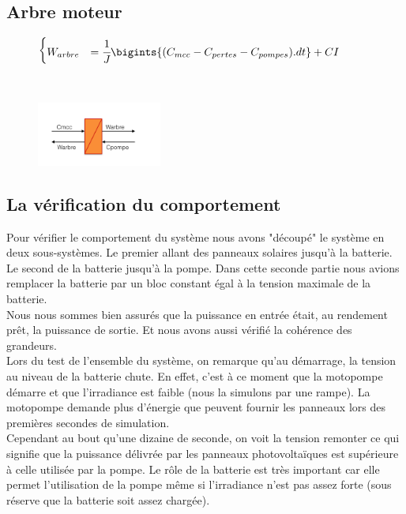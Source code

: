 \subsection{Arbre moteur}
\vspace{-10px}
\begin{figure}[ht]
\centering
\begin{minipage}{.5\textwidth}  
\centering
$\begin{cases}
	 W_{arbre} &= \cfrac{1}{J}\bigints{(C_{mcc}-C_{pertes}-C_{pompes}).dt}+CI
\end{cases}$
\end{minipage}~
\begin{minipage}{.5\textwidth}
  \centering
\includegraphics[height=80px]{images/arbre.png}
\end{minipage}
\end{figure}
\FloatBarrier
\vspace{50px}


\subsection{La vérification du comportement}

Pour vérifier le comportement du système nous avons "découpé" le système en deux sous-systèmes. Le premier allant des panneaux solaires jusqu'à la batterie. Le second de la batterie jusqu'à la pompe. Dans cette seconde partie nous avions remplacer la batterie par un bloc constant égal à la tension maximale de la batterie.\\
Nous nous sommes bien assurés que la puissance en entrée était, au rendement prêt, la puissance de sortie. Et nous avons aussi vérifié la cohérence des grandeurs.\\

Lors du test de l'ensemble du système, on remarque qu'au démarrage, la tension au niveau de la batterie chute. En effet, c'est à ce moment que la motopompe démarre et que l'irradiance est faible (nous la simulons par une rampe). La motopompe demande plus d’énergie que peuvent fournir les panneaux lors des premières secondes de simulation.\\
Cependant au bout qu'une dizaine de seconde, on voit la tension remonter ce qui signifie que la puissance délivrée par les panneaux photovoltaïques est supérieure à celle utilisée par la pompe. Le rôle de la batterie est très important car elle permet l'utilisation de la pompe même si l'irradiance n'est pas assez forte (sous réserve que la batterie soit assez chargée). 

